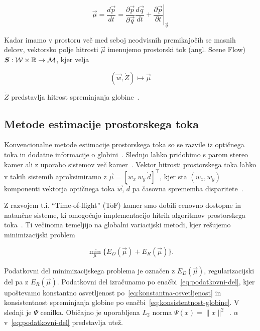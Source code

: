 \begin{equation}\label{eq:scene-flow}
	\vec{\mu} = \frac{d\vec{p}}{dt} = \frac{\partial \vec{p}}{\partial \vec{q}} \frac{d\vec{q}}{dt} + \left.\frac{\partial \vec{p}}{\partial t}\right|_{\vec{q}}
\end{equation}

Kadar imamo v prostoru več med seboj neodvisnih premikajočih se masnih delcev, vektorsko polje hitrosti $\vec{\mu}$ imenujemo prostorski tok (angl. Scene Flow) ${\boldsymbol{S}}: \mathcal{W} \times \mathbb{R} \to \mathcal{M}$, kjer velja

\begin{equation}
(\vec{w}, \dot{Z}) \mapsto \vec{\mu}
\label{eq:of-sf}
\end{equation}



$\dot{Z}$ predstavlja hitrost spreminjanja globine~\cite{yan2016scene}.

\subsection{Metode estimacije prostorskega toka}
Konvencionalne metode estimacije prostorskega toka so se razvile iz optičnega toka in dodatne informacije o globini~\cite{yan2016scene}. Slednjo lahko pridobimo s parom stereo kamer ali z uporabo sistemov več kamer~\cite{jaimez2015primal}. Vektor hitrosti prostorskega toka lahko v takih sistemih aproksimiramo z $\vec{\mu} = \left[w_x~w_y~\dot{d}\right]^\top$, kjer sta $(w_x, w_y)$ komponenti vektorja optičnega toka $\vec{w}$, $\dot{d}$ pa časovna sprememba disparitete~\cite{yan2016scene}.

Z razvojem t.i. ``Time-of-flight'' (ToF) kamer smo dobili cenovno dostopne in natančne sisteme, ki omogočajo implementacijo hitrih algoritmov prostorskega toka~\cite{yan2016scene,jaimez2015primal}. Ti večinoma temeljijo na globalni variacijski metodi, kjer rešujemo minimizacijski problem 

\begin{equation}\label{eq:minimizacijski-problem}
	\min_{\mu}\{E_D(\vec{\mu}) + E_R(\vec{\mu})\}.
\end{equation}

Podatkovni del minimizacijskega problema je označen z $E_D(\vec{\mu})$, regularizacijski del pa z  $E_R(\vec{\mu})$. Podatkovni del izračunamo po enačbi~\eqref{eq:podatkovni-del}, kjer upoštevamo konstantno osvetljenost po~\eqref{eq:konstantna-osvetljenost} in konsistentnost spreminjanja globine po enačbi~\eqref{eq:konsistentnost-globine}. V slednji je  $\Psi$ cenilka. Običajno je uporabljena $L_2$ norma $\Psi(x) = \| x \|^2$~\cite{yan2016scene}. $\alpha$ v~\eqref{eq:podatkovni-del} predstavlja utež.

